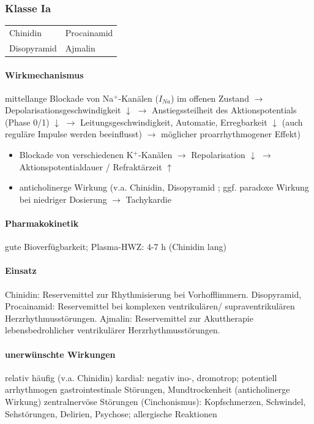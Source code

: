 \documentclass[10pt,a4paper]{report}
\begin{document}
\subsubsection{Klasse Ia} %

\begin{tabularx}{\textwidth}{XX}
Chinidin&Procainamid\\
Disopyramid&Ajmalin\\
\end{tabularx}

\paragraph{Wirkmechanismus} mittellange Blockade von Na$^+$-Kanälen ($I_{Na}$) im offenen Zustand $\rightarrow$ Depolarisationsgeschwindigkeit $\downarrow$ $\rightarrow$ Anstiegssteilheit des Aktionspotentials (Phase 0/1) $\downarrow$ $\rightarrow$ Leitungsgeschwindigkeit, Automatie, Erregbarkeit $\downarrow$ (auch reguläre Impulse werden beeinflusst) $\rightarrow$ möglicher proarrhythmogener  Effekt)

\begin{itemize}
	\item Blockade von verschiedenen K$^+$-Kanälen $\rightarrow$ Repolarisation $\downarrow$ $\rightarrow$ Aktionspotentialdauer / Refraktärzeit $\uparrow$
	\item anticholinerge Wirkung (v.a. Chinidin, Disopyramid ; ggf. paradoxe Wirkung bei niedriger Dosierung  $\rightarrow$ Tachykardie
\end{itemize}

\paragraph{Pharmakokinetik} gute Bioverfügbarkeit; Plasma-HWZ: 4-7 h (Chinidin lang)

\paragraph{Einsatz}	Chinidin: Reservemittel zur Rhythmisierung bei Vorhofflimmern. Disopyramid, Procainamid: Reservemittel bei komplexen ventrikulären/ supraventrikulären Herzrhythmusstörungen. Ajmalin: Reservemittel zur Akuttherapie lebensbedrohlicher ventrikulärer Herzrhythmusstörungen.

\paragraph{unerwünschte Wirkungen} relativ häufig (v.a. Chinidin) kardial: negativ ino-, dromotrop; potentiell arrhythmogen
gastrointestinale Störungen, Mundtrockenheit (anticholinerge Wirkung) zentralnervöse Störungen (Cinchonismus): Kopfschmerzen, Schwindel, Sehstörungen, Delirien, Psychose;   allergische Reaktionen
\end{document}
